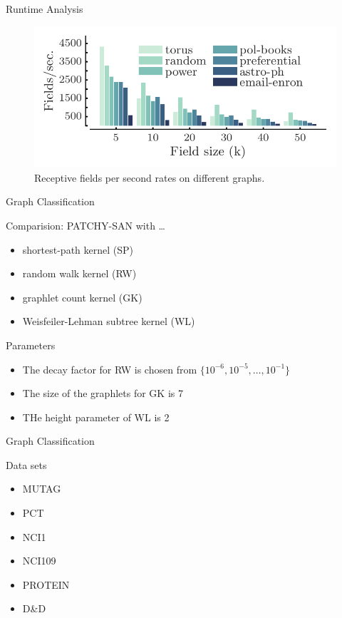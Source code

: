 \documentclass[dvipdfmx]{beamer}
\begin{document}
  \begin{frame}{Runtime Analysis}
    \begin{figure}[h]
      \centering
      \includegraphics[width=0.7\paperwidth]{img/Fig4.png}
      \caption{Receptive fields per second rates on different graphs.}
    \end{figure} 
  \end{frame}

  \begin{frame}{Graph Classification}
    \begin{block}{Comparision: PATCHY-SAN with \dots}
      \begin{itemize}
        \item shortest-path kernel (SP)
        \item random walk kernel (RW)
        \item graphlet count kernel (GK)
        \item Weisfeiler-Lehman subtree kernel (WL)
      \end{itemize}
    \end{block}

    \begin{exampleblock}{Parameters}
      \begin{itemize}
        \item The decay factor for RW is chosen from $\{10^{-6}, 10^{-5}, \dots, 10^{-1}\}$
        \item The size of the graphlets for GK is 7
        \item THe height parameter of WL is 2
      \end{itemize}
    \end{exampleblock}
  \end{frame}

  \begin{frame}{Graph Classification}
    \begin{block}{Data sets}
      \begin{itemize}
        \item MUTAG
        \item PCT
        \item NCI1
        \item NCI109
        \item PROTEIN
        \item D\&D 
      \end{itemize}
    \end{block}
  \end{frame}
\end{document}
